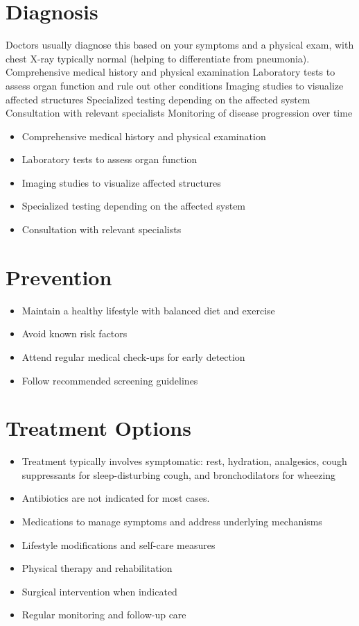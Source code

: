 \section{Diagnosis}
Doctors usually diagnose this based on your symptoms and a physical exam, with chest X-ray typically normal (helping to differentiate from pneumonia). Comprehensive medical history and physical examination Laboratory tests to assess organ function and rule out other conditions Imaging studies to visualize affected structures Specialized testing depending on the affected system Consultation with relevant specialists Monitoring of disease progression over time

\begin{itemize}[noitemsep]
  \item Comprehensive medical history and physical examination
  \item Laboratory tests to assess organ function
  \item Imaging studies to visualize affected structures
  \item Specialized testing depending on the affected system
  \item Consultation with relevant specialists
\end{itemize}
\section{Prevention}
\begin{itemize}[noitemsep]
  \item Maintain a healthy lifestyle with balanced diet and exercise
  \item Avoid known risk factors
  \item Attend regular medical check-ups for early detection
  \item Follow recommended screening guidelines
\end{itemize}
\section{Treatment Options}
\begin{itemize}[noitemsep]
  \item Treatment typically involves symptomatic: rest, hydration, analgesics, cough suppressants for sleep-disturbing cough, and bronchodilators for wheezing
  \item Antibiotics are not indicated for most cases.
  \item Medications to manage symptoms and address underlying mechanisms
  \item Lifestyle modifications and self-care measures
  \item Physical therapy and rehabilitation
  \item Surgical intervention when indicated
  \item Regular monitoring and follow-up care
\end{itemize}
